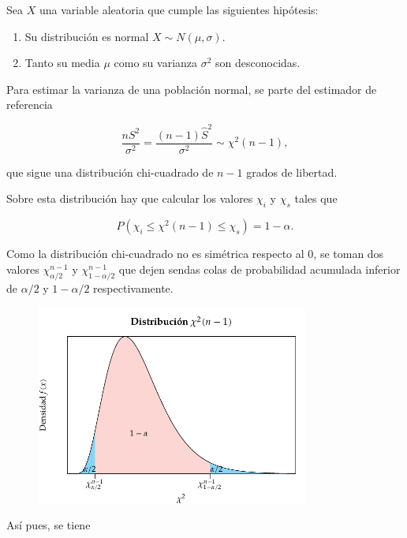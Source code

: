 \documentclass[
  a4paper,
]{scrreport}
\providecommand{\tightlist}{%
  \setlength{\itemsep}{0pt}\setlength{\parskip}{0pt}}\usepackage{longtable,booktabs,array}
\theoremstyle{plain}
\theoremstyle{definition}
\theoremstyle{definition}
\theoremstyle{remark}
\begin{document}
Sea \(X\) una variable aleatoria que cumple las siguientes hipótesis:

\begin{enumerate}
\def\labelenumi{\arabic{enumi}.}
\tightlist
\item
  Su distribución es normal \(X\sim N(\mu,\sigma)\).
\item
  Tanto su media \(\mu\) como su varianza \(\sigma^2\) son desconocidas.
\end{enumerate}

Para estimar la varianza de una población normal, se parte del estimador
de referencia

\[
\frac{nS^2}{\sigma^2} = \frac{(n-1)\hat{S}^2}{\sigma^2}\sim \chi^2(n-1),
\]

que sigue una distribución chi-cuadrado de \(n-1\) grados de libertad.

Sobre esta distribución hay que calcular los valores \(\chi_i\) y
\(\chi_s\) tales que

\[
P(\chi_i\leq \chi^2(n-1) \leq \chi_s) = 1-\alpha.
\]

Como la distribución chi-cuadrado no es simétrica respecto al 0, se
toman dos valores \(\chi^{n-1}_{\alpha/2}\) y
\(\chi^{n-1}_{1-\alpha/2}\) que dejen sendas colas de probabilidad
acumulada inferior de \(\alpha/2\) y \(1-\alpha/2\) respectivamente.

\begin{figure}

{\centering \includegraphics[width=0.8\textwidth,height=\textheight]{img/estimacion/extremos-intervalo-varianza-normal.pdf}

}

\end{figure}

Así pues, se tiene
\end{document}
